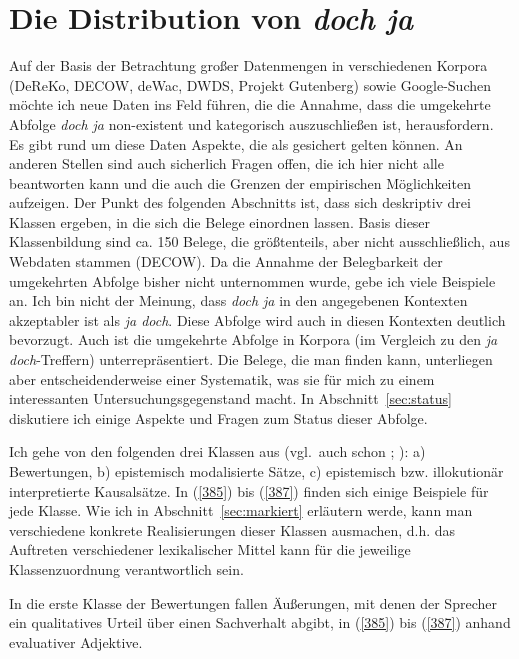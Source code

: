 \section{Die Distribution von \textit{doch ja}}
\label{sec:distributiondj}
Auf der Basis der Betrachtung großer Datenmengen in verschiedenen Korpora (DeReKo, DECOW, deWac, DWDS, Projekt Gutenberg) sowie   Google-Suchen möchte ich neue Daten ins Feld führen, die die Annahme, dass die umge\-kehrte Abfolge \textit{doch ja} non-existent und kategorisch auszuschließen ist, herausfordern. Es gibt rund um diese Daten Aspekte, die als gesichert gelten können. An anderen Stellen sind auch sicherlich Fragen offen, die ich hier nicht alle beantworten kann und die auch die Grenzen der empirischen Möglichkeiten aufzeigen. Der Punkt des folgenden Abschnitts ist, dass sich deskriptiv drei Klassen ergeben, in die sich die Belege einordnen lassen. Basis dieser Klassenbildung sind ca. 150 Belege, die größtenteils, aber nicht ausschließlich, aus Webdaten stammen (DECOW). Da die Annahme der Belegbarkeit der umgekehrten Abfolge bisher nicht unternommen wurde, gebe ich viele Beispiele an. Ich bin nicht der Meinung, dass \textit{doch ja} in den angegebenen Kontexten akzeptabler ist als \textit{ja doch}. Diese Abfolge wird auch in diesen Kontexten deutlich bevorzugt. Auch ist die umgekehrte Abfolge in Korpora (im Vergleich zu den \textit{ja doch}-Treffern) unterrepräsentiert. Die Belege, die man finden kann, unterliegen aber entscheidenderweise einer Syste\-matik, was sie für mich zu einem interessanten Untersuchungsgegenstand macht. In Abschnitt~\ref{sec:status} diskutiere ich einige Aspekte und Fragen zum Status dieser Abfolge.
  
Ich gehe von den folgenden drei Klassen aus (vgl.\ auch schon \citealt[175--177]{Mueller2014a}; \citeyear[207--210]{Mueller2017b}): a)  Bewertungen, b)  epistemisch modalisierte Sätze, c)  epistemisch bzw. illokutionär interpretierte Kausalsätze. In (\ref{385}) bis (\ref{387}) finden sich einige Beispiele für jede Klasse. Wie ich in Abschnitt~\ref{sec:markiert} erläutern werde, kann man verschiedene konkrete Realisierungen dieser Klassen ausmachen, d.h. das Auftreten verschiedener lexikalischer Mittel kann für die jeweilige Klassenzuordnung verantwortlich sein. 

In die erste Klasse der Bewertungen fallen Äußerungen, mit denen der Sprecher ein qualitatives Urteil über einen Sachverhalt abgibt, in (\ref{385}) bis (\ref{387}) anhand  eva\-luativer Adjektive.

